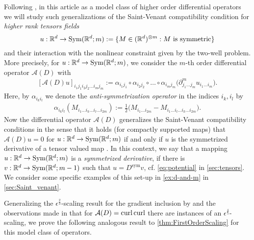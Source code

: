 \documentclass[a4paper, 10pt, twoside, notitlepage]{amsart}
\theoremstyle{plain}
\newcommand{\R}{\mathbb{R}}
\newcommand{\p}{\partial}
\newcommand{\A}{\mathcal{A}}
\renewcommand{\S}[1]{\textup{Sym}(\R^d;#1)}
\newcommand{\Ds}{D^{\text{sym}}}
\begin{document}
	Following \cite[Chapter 2]{Sha94}, in
	this article as a model class of higher order differential operators we will study such generalizations of the Saint-Venant compatibility condition for \emph{higher rank tensors fields}
	\begin{align*}
		u : \R^d \to \S{m}:=\{M \in (\R^d)^{\otimes m}: M \mbox{ is symmetric}\}
	\end{align*}
	and their interaction with the nonlinear constraint given by the two-well problem.
	More precisely, for $u : \R^d \to \S{m}$, we consider the $m$-th order differential operator $\A(D)$ with
	\begin{align}
		\label{eq:compat_op}
		[\A(D)u]_{i_1 j_1 i_2 j_2 \dots i_m j_m} := \alpha_{i_1 j_1} \circ \alpha_{i_2 j_2} \circ \dots \circ \alpha_{i_m j_m} \Big( \p_{j_1 \dots j_m}^m u_{i_1 \dots i_m} \Big).
	\end{align}
	Here, by $\alpha_{i_k i_l}$ we denote the \emph{anti-symmetrization operator} in the indices $i_k, i_l$ by
	\begin{align*}
		\alpha_{i_k i_l}(M_{i_1 \dots i_k \dots i_l \dots i_{2m}}) := \frac{1}{2} \Big( M_{i_1 \dots i_{2m}} - M_{i_1 \dots i_l \dots i_k \dots i_{2m}} \Big).
	\end{align*}
        Now the differential operator $\mathcal{A}(D)$ generalizes the Saint-Venant compatibility conditions in the sense that it holds (for compactly supported maps) that $\A(D)u = 0$ for
	$u: \R^d \to \S{m}$ if and only if $u$ is the symmetrized derivative of a tensor valued map \cite[Theorem 2.2.1]{Sha94}. In this context, we say that a mapping $u: \R^d \to \S{m}$ is a
	\emph{symmetrized derivative}, if there is $v: \R^d \to \S{m-1}$ such that $u = \Ds v$, cf. \eqref{eq:potential} in \cref{sec:tensors}.
	We consider some specific examples of this set-up in \cref{ex:d-and-m} in \cref{sec:Saint_venant}.
	
	
        Generalizing the $\epsilon^{\frac{2}{3}}$-scaling result for the gradient inclusion by \cite{KM92,KM94} and the observations made in \cite{CC15} that for $\A(D) = \curl \curl$ there are instances of an $\epsilon^{\frac{4}{5}}$- scaling, we prove the following analogous result to \cref{thm:FirstOrderScaling} for this model class of operators.
        
\end{document}
